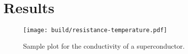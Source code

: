 \section{Results}
\label{sec:results}

\begin{figure}
  \centering
  \texttt{[image: build/resistance-temperature.pdf]}
  \caption{Sample plot for the conductivity of a superconductor.}
  \label{fig:R-T}
\end{figure}
